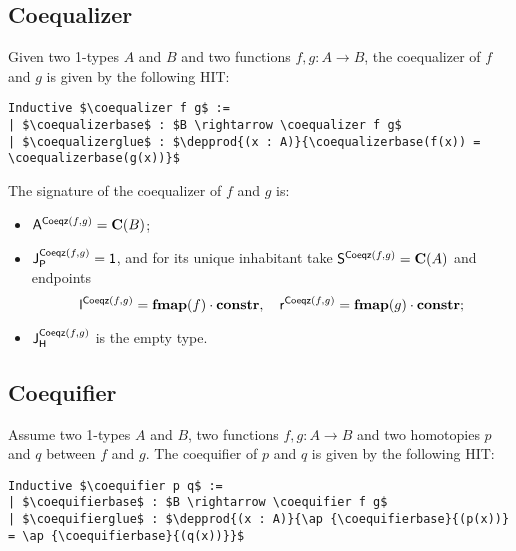 \subsection{Coequalizer}
\label{sec:coequalizer}

Given two 1-types $A$ and $B$ and two functions $f , g: A \to B$, the
coequalizer of $f$ and $g$ is given by the following HIT:
\begin{lstlisting}[mathescape=true]
Inductive $\coequalizer f g$ :=
| $\coequalizerbase$ : $B \rightarrow \coequalizer f g$
| $\coequalizerglue$ : $\depprod{(x : A)}{\coequalizerbase(f(x)) = \coequalizerbase(g(x))}$
\end{lstlisting}

The signature of the coequalizer of $f$ and $g$ is:
\begin{itemize}
\item $\pointconstr[\coequalizer f g] = \constantP{B}$;
\item $\pathlabel[\coequalizer f g] = \unit$, and for its unique inhabitant take $\patharg[\coequalizer f g] = \constantP{A}$ and endpoints
  \[
  \pathleft[\coequalizer f g] = \comp{\fmap(f)}{\constr}, \quad
  \pathright[\coequalizer f g] = \comp{\fmap(g)}{\constr}; 
  \]
\item $\homotlabel[\coequalizer f g]$ is the empty type.
\end{itemize}

\subsection{Coequifier}
\label{sec:coequifier}

Assume two 1-types $A$ and $B$, two functions $f , g: A \to B$ and two
homotopies $p$ and $q$ between $f$ and $g$. The coequifier of $p$ and
$q$ is given by the following HIT:
\begin{lstlisting}[mathescape=true]
Inductive $\coequifier p q$ :=
| $\coequifierbase$ : $B \rightarrow \coequifier f g$
| $\coequifierglue$ : $\depprod{(x : A)}{\ap {\coequifierbase}{(p(x))} = \ap {\coequifierbase}{(q(x))}}$
\end{lstlisting}

